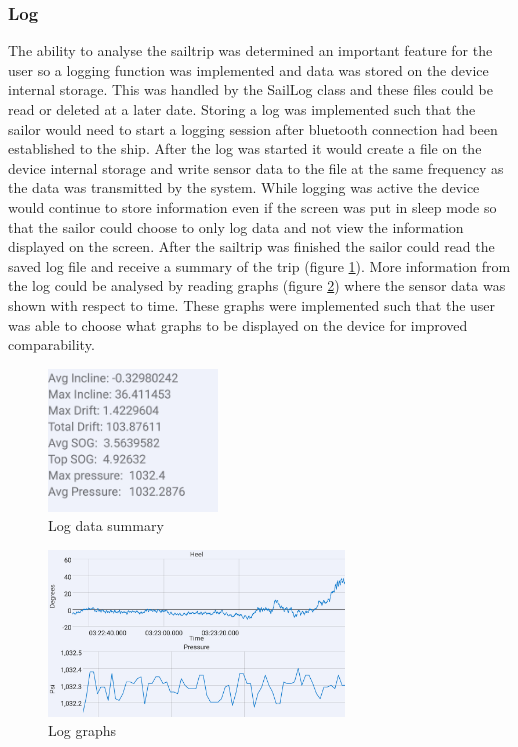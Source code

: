 \subsubsection{Log}
The ability to analyse the sailtrip was determined an important feature for the user so a logging function was implemented and data was stored on the device internal storage. This was handled by the SailLog class and these files could be read or deleted at a later date. Storing a log was implemented such that the sailor would need to start a logging session after bluetooth connection had been established to the ship. After the log was started it would create a file on the device internal storage and write sensor data to the file at the same frequency as the data was transmitted by the system. While logging was active the device would continue to store information even if the screen was put in sleep mode so that the sailor could choose to only log data and not view the information displayed on the screen. After the sailtrip was finished the sailor could read the saved log file and receive a summary of the trip (figure \ref{log-summary}). More information from the log could be analysed by reading graphs (figure \ref{log-graph}) where the sensor data was shown with respect to time. These graphs were implemented such that the user was able to choose what graphs to be displayed on the device for improved comparability.
\begin{figure}[H]
\centering
\includegraphics[width=0.4\textwidth]{Figures/log_data.png}
\caption{Log data summary}
\label{log-summary}
\end{figure}
\begin{figure}[H]
\centering
\includegraphics[width=0.7\textwidth]{Figures/log_graph.png}
\caption{Log graphs}
\label{log-graph}
\end{figure}

